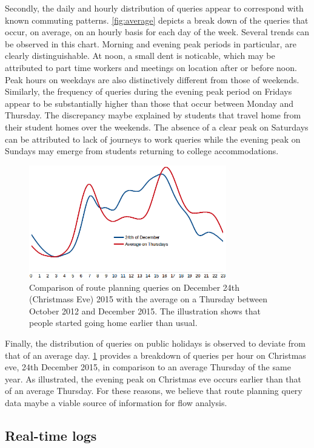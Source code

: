 \documentclass{sig-alternate}
\newcommand{\todo}[1]{\noindent\textcolor{red}{{\bf \{TODO}: #1{\bf \}}}}
\begin{document}
Secondly, the daily and hourly distribution of queries appear to correspond with known commuting patterns. 
\cref{fig:average} depicts a break down of the queries that occur, on average, on an hourly basis for each day of the week.
Several trends can be observed in this chart. 
Morning and evening peak periods in particular, are clearly distinguishable.
At noon, a small dent is noticable, which may be attributed to part time workers and meetings on location after or before noon.
Peak hours on weekdays are also distinctively different from those of weekends.
Similarly, the frequency of queries during the evening peak period on Fridays appear to be substantially higher than those that occur between Monday and Thursday.
The discrepancy maybe explained by students that travel home from their student homes over the weekends. 
The absence of a clear peak on Saturdays can be attributed to lack of journeys to work queries while the evening peak on Sundays may emerge from students returning to college accommodations.

\begin{figure}
\centering
\includegraphics[width=8.6cm]{dec24}
\caption{Comparison of route planning queries on December 24th (Christmass Eve) 2015 with the average on a Thursday between October 2012 and December 2015. The illustration shows that people started going home earlier than usual.}
\label{fig:dec24}
\end{figure}

Finally, the distribution of queries on public holidays is observed to deviate from that of an average day. 
\cref{fig:dec24} provides a breakdown of queries per hour on Christmas eve, 24th December 2015, in comparison to an average Thursday of the same year. 
As illustrated, the evening peak on Christmas eve occurs earlier than that of an average Thursday. 
For these reasons, we believe that route planning query data maybe a viable source of information for flow analysis.%

\subsection{Real-time logs}
\label{sec:realtimelogs}
\end{document}
